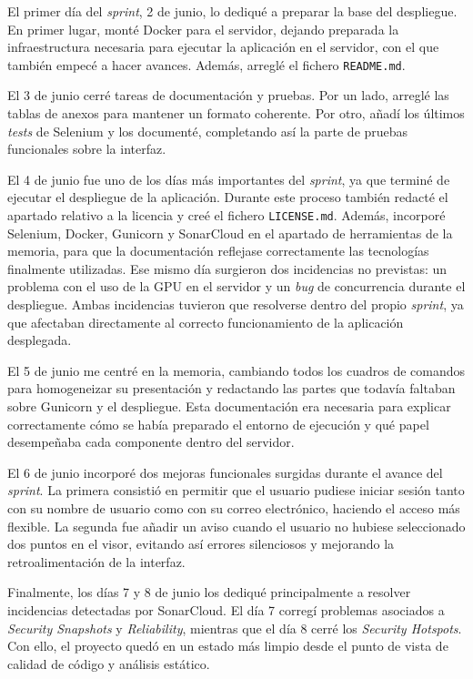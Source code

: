 El primer día del \textit{sprint}, 2 de junio, lo dediqué a preparar la base del despliegue. En primer lugar, monté Docker para el servidor, dejando preparada la infraestructura necesaria para ejecutar la aplicación en el servidor, con el que también empecé a hacer avances. Además, arreglé el fichero \texttt{README.md}.

El 3 de junio cerré tareas de documentación y pruebas. Por un lado, arreglé las tablas de anexos para mantener un formato coherente. Por otro, añadí los últimos \textit{tests} de Selenium y los documenté, completando así la parte de pruebas funcionales sobre la interfaz.

El 4 de junio fue uno de los días más importantes del \textit{sprint}, ya que terminé de ejecutar el despliegue de la aplicación. Durante este proceso también redacté el apartado relativo a la licencia y creé el fichero \texttt{LICENSE.md}. Además, incorporé Selenium, Docker, Gunicorn y SonarCloud en el apartado de herramientas de la memoria, para que la documentación reflejase correctamente las tecnologías finalmente utilizadas. Ese mismo día surgieron dos incidencias no previstas: un problema con el uso de la GPU en el servidor y un \textit{bug} de concurrencia durante el despliegue. Ambas incidencias tuvieron que resolverse dentro del propio \textit{sprint}, ya que afectaban directamente al correcto funcionamiento de la aplicación desplegada.

El 5 de junio me centré en la memoria, cambiando todos los cuadros de comandos para homogeneizar su presentación y redactando las partes que todavía faltaban sobre Gunicorn y el despliegue. Esta documentación era necesaria para explicar correctamente cómo se había preparado el entorno de ejecución y qué papel desempeñaba cada componente dentro del servidor.

El 6 de junio incorporé dos mejoras funcionales surgidas durante el avance del \textit{sprint}. La primera consistió en permitir que el usuario pudiese iniciar sesión tanto con su nombre de usuario como con su correo electrónico, haciendo el acceso más flexible. La segunda fue añadir un aviso cuando el usuario no hubiese seleccionado dos puntos en el visor, evitando así errores silenciosos y mejorando la retroalimentación de la interfaz.

Finalmente, los días 7 y 8 de junio los dediqué principalmente a resolver incidencias detectadas por SonarCloud. El día 7 corregí problemas asociados a \textit{Security Snapshots} y \textit{Reliability}, mientras que el día 8 cerré los \textit{Security Hotspots}. Con ello, el proyecto quedó en un estado más limpio desde el punto de vista de calidad de código y análisis estático.

